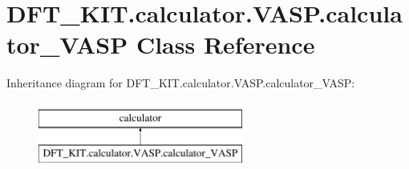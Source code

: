 \hypertarget{class_d_f_t___k_i_t_1_1calculator_1_1_v_a_s_p_1_1calculator___v_a_s_p}{\section{D\+F\+T\+\_\+\+K\+I\+T.\+calculator.\+V\+A\+S\+P.\+calculator\+\_\+\+V\+A\+S\+P Class Reference}
\label{class_d_f_t___k_i_t_1_1calculator_1_1_v_a_s_p_1_1calculator___v_a_s_p}
}
Inheritance diagram for D\+F\+T\+\_\+\+K\+I\+T.\+calculator.\+V\+A\+S\+P.\+calculator\+\_\+\+V\+A\+S\+P\+:\begin{figure}[H]
\begin{center}
\leavevmode
\includegraphics[height=2.000000cm]{class_d_f_t___k_i_t_1_1calculator_1_1_v_a_s_p_1_1calculator___v_a_s_p}
\end{center}
\end{figure}
